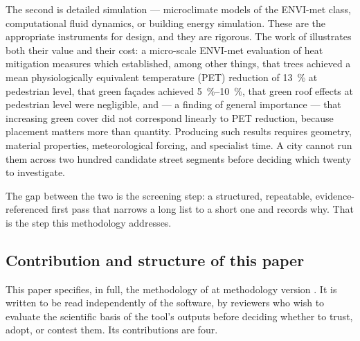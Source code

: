 The second is detailed simulation --- microclimate models of the ENVI-met
class, computational fluid dynamics, or building energy simulation. These are
the appropriate instruments for design, and they are rigorous. The work of
\textcite{zolch2016} illustrates both their value and their cost: a micro-scale
ENVI-met evaluation of heat mitigation measures which established, among other
things, that trees achieved a mean physiologically equivalent temperature (PET)
reduction of \SI{13}{\percent} at pedestrian level, that green fa\c{c}ades
achieved \SIrange{5}{10}{\percent}, that green roof effects at pedestrian level
were negligible, and --- a finding of general importance --- that increasing
green cover did not correspond linearly to PET reduction, because placement
matters more than quantity. Producing such results requires geometry, material
properties, meteorological forcing, and specialist time. A city cannot run them
across two hundred candidate street segments before deciding which twenty to
investigate.

The gap between the two is the screening step: a structured, repeatable,
evidence-referenced first pass that narrows a long list to a short one and
records why. That is the step this methodology addresses.

\subsection{Contribution and structure of this paper}

This paper specifies, in full, the methodology of \tool{} at methodology
version \methver{}. It is written to be read independently of the software, by
reviewers who wish to evaluate the scientific basis of the tool's outputs
before deciding whether to trust, adopt, or contest them. Its contributions
are four.

